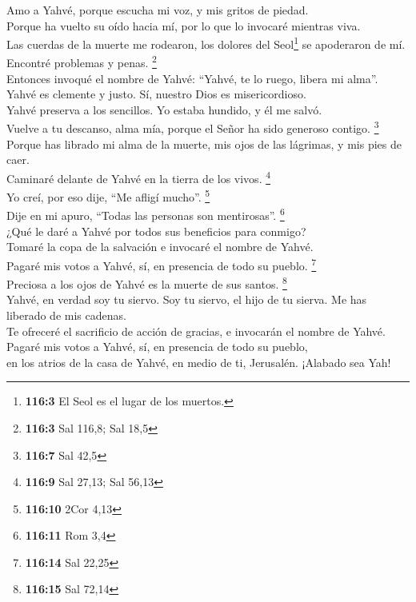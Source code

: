  Amo a Yahvé, porque escucha mi voz, y mis gritos de
piedad.\\
 Porque ha vuelto su oído hacia mí, por lo que lo invocaré
mientras viva.\\
 Las cuerdas de la muerte me rodearon, los dolores del
Seol\footnote{\textbf{116:3} El Seol es el lugar de los muertos.} se
apoderaron de mí. Encontré problemas y penas. \footnote{\textbf{116:3}
  Sal 116,8; Sal 18,5}\\
 Entonces invoqué el nombre de Yahvé: ``Yahvé, te lo
ruego, libera mi alma''.\\
 Yahvé es clemente y justo. Sí, nuestro Dios es
misericordioso.\\
 Yahvé preserva a los sencillos. Yo estaba hundido, y él
me salvó.\\
 Vuelve a tu descanso, alma mía, porque el Señor ha sido
generoso contigo. \footnote{\textbf{116:7} Sal 42,5}\\
 Porque has librado mi alma de la muerte, mis ojos de las
lágrimas, y mis pies de caer.\\
 Caminaré delante de Yahvé en la tierra de los vivos.
\footnote{\textbf{116:9} Sal 27,13; Sal 56,13}\\
 Yo creí, por eso dije, ``Me afligí mucho''.
\footnote{\textbf{116:10} 2Cor 4,13}\\
 Dije en mi apuro, ``Todas las personas son mentirosas''.
\footnote{\textbf{116:11} Rom 3,4}\\
 ¿Qué le daré a Yahvé por todos sus beneficios para
conmigo?\\
 Tomaré la copa de la salvación e invocaré el nombre de
Yahvé.\\
 Pagaré mis votos a Yahvé, sí, en presencia de todo su
pueblo. \footnote{\textbf{116:14} Sal 22,25}\\
 Preciosa a los ojos de Yahvé es la muerte de sus santos.
\footnote{\textbf{116:15} Sal 72,14}\\
 Yahvé, en verdad soy tu siervo. Soy tu siervo, el hijo
de tu sierva. Me has liberado de mis cadenas.\\
 Te ofreceré el sacrificio de acción de gracias, e
invocarán el nombre de Yahvé.\\
 Pagaré mis votos a Yahvé, sí, en presencia de todo su
pueblo,\\
 en los atrios de la casa de Yahvé, en medio de ti,
Jerusalén. ¡Alabado sea Yah!

